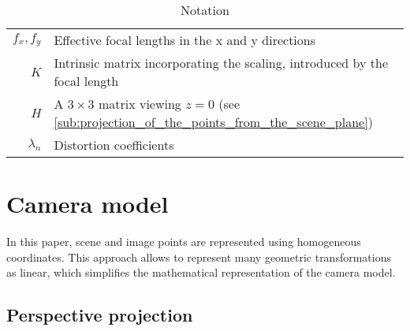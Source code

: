 \begin{table}[htbp]
\begin{tabular}{rl}
		\(f_x, f_y\)                   & Effective focal lengths in the x and y directions                                                      \\
		\(K\)                          & Intrinsic matrix incorporating the scaling, introduced by the focal length                             \\
		\(H\)                          & A \(3 \times 3\) matrix viewing \(z=0\) (see \cref{sub:projection_of_the_points_from_the_scene_plane}) \\
		\(\lambda_n\)                  & Distortion coefficients                                                                                \\
		\bottomrule
	\end{tabular}
	\caption{Notation}
\end{table}

\section{Camera model}\label{sec:camera_model}

In this paper, scene and image points are represented using homogeneous
coordinates. This approach allows to represent many geometric transformations as
linear, which simplifies the mathematical representation of the camera model.

\subsection{Perspective projection}\label{sub:perspective_projection}

